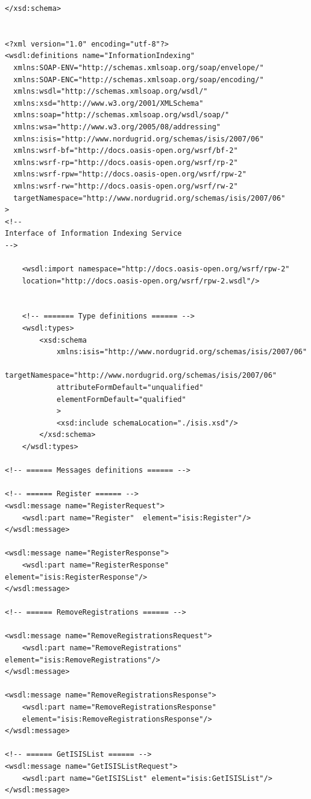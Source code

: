 \documentclass{book}
\begin{document}
\begin{verbatim}
</xsd:schema>


<?xml version="1.0" encoding="utf-8"?>
<wsdl:definitions name="InformationIndexing"
  xmlns:SOAP-ENV="http://schemas.xmlsoap.org/soap/envelope/"
  xmlns:SOAP-ENC="http://schemas.xmlsoap.org/soap/encoding/"
  xmlns:wsdl="http://schemas.xmlsoap.org/wsdl/"
  xmlns:xsd="http://www.w3.org/2001/XMLSchema"
  xmlns:soap="http://schemas.xmlsoap.org/wsdl/soap/"
  xmlns:wsa="http://www.w3.org/2005/08/addressing"
  xmlns:isis="http://www.nordugrid.org/schemas/isis/2007/06"
  xmlns:wsrf-bf="http://docs.oasis-open.org/wsrf/bf-2"
  xmlns:wsrf-rp="http://docs.oasis-open.org/wsrf/rp-2"
  xmlns:wsrf-rpw="http://docs.oasis-open.org/wsrf/rpw-2"
  xmlns:wsrf-rw="http://docs.oasis-open.org/wsrf/rw-2"
  targetNamespace="http://www.nordugrid.org/schemas/isis/2007/06"
>
<!--
Interface of Information Indexing Service
-->

    <wsdl:import namespace="http://docs.oasis-open.org/wsrf/rpw-2" 
    location="http://docs.oasis-open.org/wsrf/rpw-2.wsdl"/>


    <!-- ======= Type definitions ====== -->
    <wsdl:types>
        <xsd:schema
            xmlns:isis="http://www.nordugrid.org/schemas/isis/2007/06"
            targetNamespace="http://www.nordugrid.org/schemas/isis/2007/06"
            attributeFormDefault="unqualified"
            elementFormDefault="qualified"
            >
            <xsd:include schemaLocation="./isis.xsd"/>
        </xsd:schema>
    </wsdl:types>

<!-- ====== Messages definitions ====== -->

<!-- ====== Register ====== -->
<wsdl:message name="RegisterRequest">
    <wsdl:part name="Register"  element="isis:Register"/>
</wsdl:message>

<wsdl:message name="RegisterResponse">
    <wsdl:part name="RegisterResponse" element="isis:RegisterResponse"/>
</wsdl:message>

<!-- ====== RemoveRegistrations ====== -->

<wsdl:message name="RemoveRegistrationsRequest">
    <wsdl:part name="RemoveRegistrations" element="isis:RemoveRegistrations"/>
</wsdl:message>

<wsdl:message name="RemoveRegistrationsResponse">
    <wsdl:part name="RemoveRegistrationsResponse" 
    element="isis:RemoveRegistrationsResponse"/>
</wsdl:message>

<!-- ====== GetISISList ====== -->
<wsdl:message name="GetISISListRequest">
    <wsdl:part name="GetISISList" element="isis:GetISISList"/>
</wsdl:message>


\end{verbatim}
\end{document}
